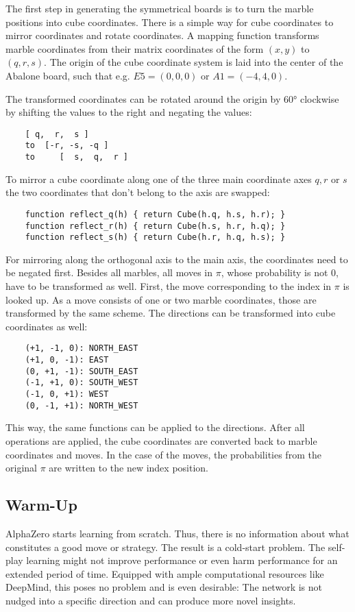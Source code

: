 The first step in generating the symmetrical boards is to turn the marble positions into cube coordinates. There is a simple way for cube coordinates to mirror coordinates and rotate coordinates. A mapping function transforms marble coordinates from their matrix coordinates of the form $(x, y)$ to $(q, r, s)$. The origin of the cube coordinate system is laid into the center of the Abalone board, such that e.g. $E5 = (0, 0, 0)$ or $A1 = (-4, 4, 0)$.

The transformed coordinates can be rotated around the origin by 60° clockwise by shifting the values to the right and negating the values:

\begin{BVerbatim}
    [ q,  r,  s ]
    to  [-r, -s, -q ]
    to     [  s,  q,  r ]
\end{BVerbatim}

To mirror a cube coordinate along one of the three main coordinate axes $q, r$ or $s$ the two coordinates that don't belong to the axis are swapped:

\begin{BVerbatim}
    function reflect_q(h) { return Cube(h.q, h.s, h.r); }
    function reflect_r(h) { return Cube(h.s, h.r, h.q); }
    function reflect_s(h) { return Cube(h.r, h.q, h.s); }
\end{BVerbatim}

For mirroring along the orthogonal axis to the main axis, the coordinates need to be negated first. Besides all marbles, all moves in $\pi$, whose probability is not $0$, have to be transformed as well. First, the move corresponding to the index in $\pi$ is looked up. As a move consists of one or two marble coordinates, those are transformed by the same scheme. The directions can be transformed into cube coordinates as well:

\begin{BVerbatim}
    (+1, -1, 0): NORTH_EAST
    (+1, 0, -1): EAST
    (0, +1, -1): SOUTH_EAST
    (-1, +1, 0): SOUTH_WEST
    (-1, 0, +1): WEST
    (0, -1, +1): NORTH_WEST
\end{BVerbatim}

This way, the same functions can be applied to the directions. After all operations are applied, the cube coordinates are converted back to marble coordinates and moves. In the case of the moves, the probabilities from the original $\pi$ are written to the new index position.

\subsection{Warm-Up}
AlphaZero starts learning from scratch. Thus, there is no information about what constitutes a good move or strategy. The result is a cold-start problem. The self-play learning might not improve performance or even harm performance for an extended period of time. Equipped with ample computational resources like DeepMind, this poses no problem and is even desirable: The network is not nudged into a specific direction and can produce more novel insights.

